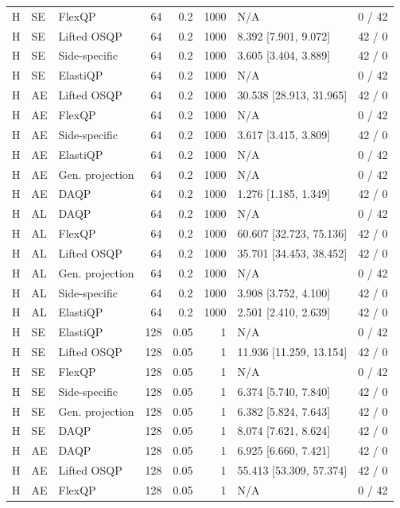 \begin{longtable}{@{}lllrrrlr@{}}
H & SE & FlexQP & 64 & 0.2 & 1000 & N/A & 0 / 42 \\
H & SE & Lifted OSQP & 64 & 0.2 & 1000 & 8.392 [7.901, 9.072] & 42 / 0 \\
H & SE & Side-specific & 64 & 0.2 & 1000 & 3.605 [3.404, 3.889] & 42 / 0 \\
H & SE & ElastiQP & 64 & 0.2 & 1000 & N/A & 0 / 42 \\
H & AE & Lifted OSQP & 64 & 0.2 & 1000 & 30.538 [28.913, 31.965] & 42 / 0 \\
H & AE & FlexQP & 64 & 0.2 & 1000 & N/A & 0 / 42 \\
H & AE & Side-specific & 64 & 0.2 & 1000 & 3.617 [3.415, 3.809] & 42 / 0 \\
H & AE & ElastiQP & 64 & 0.2 & 1000 & N/A & 0 / 42 \\
H & AE & Gen. projection & 64 & 0.2 & 1000 & N/A & 0 / 42 \\
H & AE & DAQP & 64 & 0.2 & 1000 & 1.276 [1.185, 1.349] & 42 / 0 \\
H & AL & DAQP & 64 & 0.2 & 1000 & N/A & 0 / 42 \\
H & AL & FlexQP & 64 & 0.2 & 1000 & 60.607 [32.723, 75.136] & 42 / 0 \\
H & AL & Lifted OSQP & 64 & 0.2 & 1000 & 35.701 [34.453, 38.452] & 42 / 0 \\
H & AL & Gen. projection & 64 & 0.2 & 1000 & N/A & 0 / 42 \\
H & AL & Side-specific & 64 & 0.2 & 1000 & 3.908 [3.752, 4.100] & 42 / 0 \\
H & AL & ElastiQP & 64 & 0.2 & 1000 & 2.501 [2.410, 2.639] & 42 / 0 \\
H & SE & ElastiQP & 128 & 0.05 & 1 & N/A & 0 / 42 \\
H & SE & Lifted OSQP & 128 & 0.05 & 1 & 11.936 [11.259, 13.154] & 42 / 0 \\
H & SE & FlexQP & 128 & 0.05 & 1 & N/A & 0 / 42 \\
H & SE & Side-specific & 128 & 0.05 & 1 & 6.374 [5.740, 7.840] & 42 / 0 \\
H & SE & Gen. projection & 128 & 0.05 & 1 & 6.382 [5.824, 7.643] & 42 / 0 \\
H & SE & DAQP & 128 & 0.05 & 1 & 8.074 [7.621, 8.624] & 42 / 0 \\
H & AE & DAQP & 128 & 0.05 & 1 & 6.925 [6.660, 7.421] & 42 / 0 \\
H & AE & Lifted OSQP & 128 & 0.05 & 1 & 55.413 [53.309, 57.374] & 42 / 0 \\
H & AE & FlexQP & 128 & 0.05 & 1 & N/A & 0 / 42 \\

\end{longtable}
